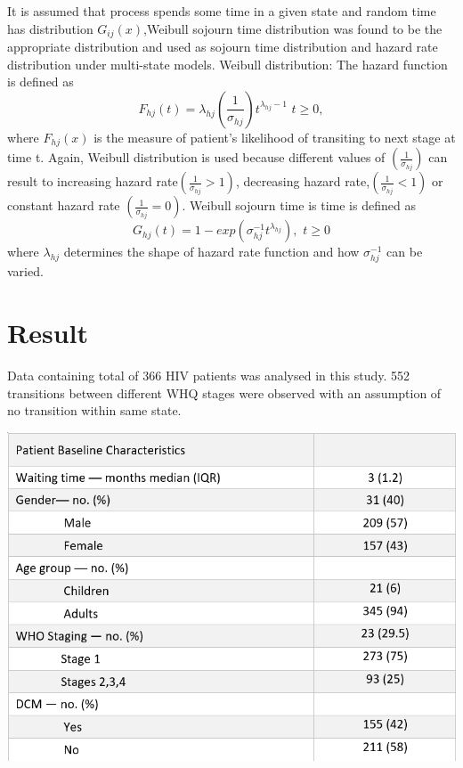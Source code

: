 \documentclass[11pt]{article}
\begin{document}
	It is assumed that process spends some time in a given state and random time has distribution $G_{ij}(x)$,Weibull sojourn time distribution was found to be the appropriate distribution and used as sojourn time distribution and hazard rate distribution under multi-state models. Weibull distribution: The hazard function is defined as 
	$$\displaystyle F_{hj}(t)=\lambda_{hj}\left(\frac{1}{\sigma_{hj}}\right)t^{\lambda _{h j}-1}\,\,t\geq 0,$$
	where  $F_{hj}(x)$ is the measure of patient's likelihood of transiting to next stage at time t. Again, Weibull distribution is used because different values of $\left(\frac{1}{\sigma_{hj}}\right)$ can result to increasing hazard rate$\left(\frac{1}{\sigma_{hj}}>1\right)$, decreasing hazard rate,$\left(\frac{1}{\sigma_{hj}}<1\right)$ or constant hazard rate $\left(\frac{1}{\sigma_{hj}}=0\right)$. 
	Weibull sojourn time is time is defined as 
	$$G_{hj}(t)=1- exp(\sigma^{-1}_{hj}t^{\lambda_{hj}}),\,\, t\geq 0$$
	where $\lambda_{hj}$ determines the shape of hazard rate function and how $\sigma^{-1}_{hj}$ can be varied. 
	\label{methods}
	
	
	
	\section{Result}\label{result}
	Data containing total of 366 HIV patients was analysed in this study. 552 transitions between different WHQ stages were observed with an assumption of no transition within same state.
	
		\begin{center}
		\includegraphics[scale=0.5]{despritive}\\
	\end{center}
\end{document}
